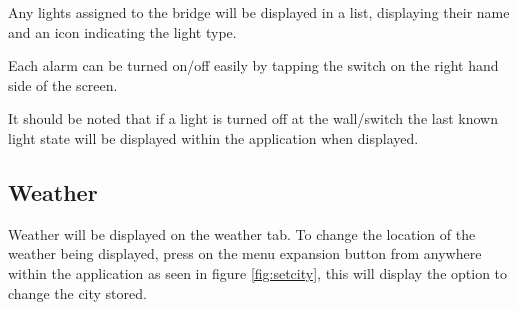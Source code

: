 Any lights assigned to the bridge will be displayed in a list,
displaying their name and an icon indicating the light type.

Each alarm can be turned on/off easily by tapping the switch on the
right hand side of the screen.

It should be noted that if a light is turned off at the wall/switch the
last known light state will be displayed within the application when
displayed.

\subsection{Weather}\label{weather}

Weather will be displayed on the weather tab. To change the location of
the weather being displayed, press on the menu expansion button from
anywhere within the application as seen in figure \ref{fig:setcity},
this will display the option to change the city stored.

